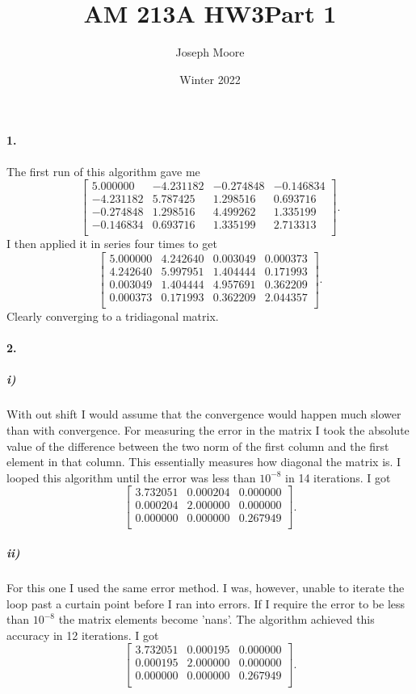 \documentclass[12pt]{article}
\title{AM 213A HW3}
\author{Joseph Moore}
\date{Winter 2022}
\begin{document}
\maketitle

\title{\textbf{Part 1}}
 
\paragraph{1.}
	The first run of this algorithm gave me
	\[
	\begin{bmatrix}
	5.000000  & -4.231182 & -0.274848 & -0.146834 \\
	-4.231182 & 5.787425 & 1.298516 & 0.693716 \\
	-0.274848 & 1.298516 & 4.499262 & 1.335199 \\
	-0.146834 & 0.693716 & 1.335199 & 2.713313 \\
	\end{bmatrix}.
	\]
	I then applied  it in series four times to get
	\[
	\begin{bmatrix}
	5.000000 & 4.242640 & 0.003049 & 0.000373 \\
	4.242640 & 5.997951 & 1.404444 & 0.171993 \\
	0.003049 & 1.404444 & 4.957691 & 0.362209 \\
	0.000373 & 0.171993 & 0.362209 & 2.044357 \\
	\end{bmatrix}.
	\]
	Clearly converging to a tridiagonal matrix.
	
\paragraph{2.}
	\subparagraph{i)}
		With out shift I would assume that the convergence would happen much slower than with convergence. For measuring the error in the matrix I took the absolute value of the difference between the two norm of the first column and the first element in that column. This essentially measures how diagonal the matrix is. I looped this algorithm until the error was less than $10^{-8}$ in 14 iterations. I got
		\[
		\begin{bmatrix}
		3.732051 & 0.000204 & 0.000000 \\ 
		0.000204 & 2.000000 & 0.000000 \\ 
		0.000000 & 0.000000 & 0.267949 \\
		\end{bmatrix}.
		\]
	
	\subparagraph{ii)}
		For this one I used the same error method. I was, however, unable to iterate the loop past a curtain point before I ran into errors. If I require the error to be less than $10^{-8}$ the matrix elements become 'nans'. The algorithm achieved this accuracy in 12 iterations. I got 
		\[
		\begin{bmatrix}
		3.732051 & 0.000195 & 0.000000 \\ 
		0.000195 & 2.000000 & 0.000000 \\ 
		0.000000 & 0.000000 & 0.267949 \\  
		\end{bmatrix}.
		\]
\end{document}
